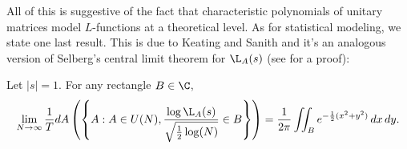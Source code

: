       All of this is suggestive of the fact that characteristic polynomials of unitary matrices model $L$-functions at a theoretical level. As for statistical modeling, we state one last result. This is due to Keating and Sanith and it's an analogous version of Selberg's central limit theorem for $\L_{A}(s)$ (see  for a proof):

      \begin{theorem}
        Let $|s| = 1$. For any rectangle $B \in \C$,
        \[
          \lim_{N \to \infty}\frac{1}{T}dA\left(\left\{A:A \in U(N),\frac{\log\L_{A}(s)}{\sqrt{\frac{1}{2}\log(N)}} \in B\right\}\right) = \frac{1}{2\pi}\iint_{B}e^{-\frac{1}{2}(x^{2}+y^{2})}\,dx\,dy.
        \]
      \end{theorem}
      \fi